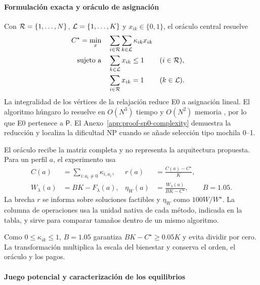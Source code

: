 \paragraph{Formulación exacta y oráculo de asignación}

Con $\mathcal{R}=\{1,\ldots,N\}$, $\mathcal{L}=\{1,\ldots,K\}$ y $x_{ik}\in\{0, 1\}$, el oráculo central resuelve
\begin{equation}
\label{eq:sp0-oracle}
\begin{aligned}
 C^\star=\min_x\quad &\sum_{i\in\mathcal{R}}\sum_{k\in\mathcal{L}}\kappa_{ik}x_{ik}\\
 \text{sujeto a}\quad &\sum_{k\in\mathcal{L}}x_{ik}\leq1 &&(i\in\mathcal{R}),\\
 &\sum_{i\in\mathcal{R}}x_{ik}=1 &&(k\in\mathcal{L}).
\end{aligned}
\end{equation}
La integralidad de los vértices de la relajación reduce E0 a asignación lineal. El algoritmo húngaro lo resuelve en \(O(N^3)\) tiempo y \(O(N^2)\) memoria \parencite{kuhn1955Hungarian}, por lo que E0 pertenece a \(\mathsf P\). El Anexo~\ref{app:proof-sp0-complexity} demuestra la reducción y localiza la dificultad NP cuando se añade selección tipo mochila 0--1.

El oráculo recibe la matriz completa y no representa la arquitectura propuesta. Para un perfil $a$, el experimento usa
\begin{equation}
 \begin{aligned}
 C(a)&=\sum_{i:a_i\neq0}\kappa_{i,a_i}, &
 r(a)&=\frac{C(a)-C^\star}{K},\\
 W_\lambda(a)&=BK-F_\lambda(a), &
 \eta_W(a)&=\frac{W_\lambda(a)}{BK-C^\star},\qquad B=1.05.
 \end{aligned}
 \label{eq:sp0-evaluation-metrics}
\end{equation}
La brecha \(r\) se informa sobre soluciones factibles y \(\eta_W\) como \(100W/W^\star\). La columna de operaciones usa la unidad nativa de cada método, indicada en la tabla, y sirve para comparar tamaños dentro de un mismo algoritmo.

Como \(0\leq\kappa_{ik}\leq1\), \(B=1.05\) garantiza \(BK-C^\star\geq0.05K\) y evita dividir por cero. La transformación multiplica la escala del bienestar y conserva el orden, el oráculo y los pagos.

\paragraph{Juego potencial y caracterización de los equilibrios}

